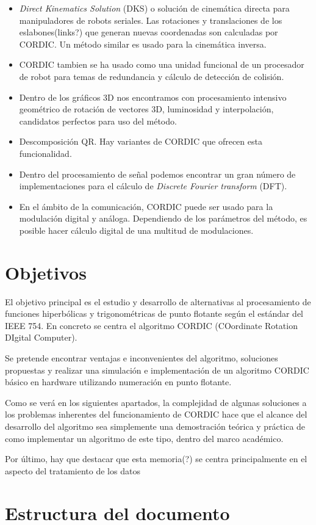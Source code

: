 \begin{itemize}
  \item \textit{Direct Kinematics Solution} (DKS) o solución de cinemática directa para manipuladores de robots seriales. Las rotaciones y translaciones de los eslabones(links?) que generan nuevas coordenadas son calculadas por CORDIC. Un método similar es usado para la cinemática inversa.
  
  \item CORDIC tambien se ha usado como una unidad funcional de un procesador de robot para temas de redundancia y cálculo de detección de colisión.
  
  \item Dentro de los gráficos 3D nos encontramos con procesamiento intensivo geométrico de rotación de vectores 3D, luminosidad y interpolación, candidatos perfectos para uso del método.
  
  \item Descomposición QR. Hay variantes de CORDIC que ofrecen esta funcionalidad.
  
  \item  Dentro del procesamiento de señal podemos encontrar un gran número de implementaciones para el cálculo de \textit{Discrete Fourier transform} (DFT).
  
  \item En el ámbito de la comunicación, CORDIC puede ser usado para la modulación digital y análoga. Dependiendo de los parámetros del método, es posible hacer cálculo digital de una multitud de modulaciones.
\end{itemize}

\section{Objetivos}
\label{objetivos}

El objetivo principal es el estudio y desarrollo de alternativas al procesamiento de funciones hiperbólicas y trigonométricas de punto flotante según el estándar del IEEE 754. En concreto se centra el algoritmo CORDIC (COordinate Rotation DIgital Computer).

Se pretende encontrar ventajas e inconvenientes del algoritmo, soluciones propuestas y realizar una simulación e implementación de un algoritmo CORDIC básico en hardware utilizando numeración en punto flotante.

Como se verá en los siguientes apartados, la complejidad de algunas soluciones a los problemas inherentes del funcionamiento de CORDIC hace que el alcance del desarrollo del algoritmo sea simplemente una demostración teórica y práctica de como implementar un algoritmo de este tipo, dentro del marco académico.

Por último, hay que destacar que esta memoria(?) se centra principalmente en el aspecto del tratamiento de los datos

\section{Estructura del documento}






















